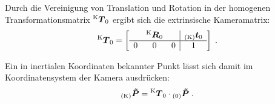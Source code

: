 Durch die Vereinigung von Translation und Rotation in der homogenen Transformationsmatrix $\tmat{K}{0}$ ergibt sich die extrinsische Kameramatrix:
%
\begin{equation}
\tmat{K}{0} = 
\mat{ccc|c}{
  & \rmat{K}{0} &   & \ve{K}{t}_\ind{0} \\
\hline
0 &      0      & 0 & 1 \\
} \; \text{.}
\end{equation}


Ein in inertialen Koordinaten bekannter Punkt lässt sich damit im Koordinatensystem der Kamera ausdrücken:
%
\begin{equation}
\ve{K}{\tilde{P}} = \tmat{K}{0} \cdot \ve{0}{\tilde{P}} \; \text{.}
\end{equation}


